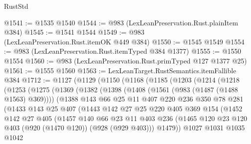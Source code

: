 \begin{lexlean}{RustStd}
\begin{coremodule}
@1541 := @1535 @1540
@1544 := @983 (LexLeanPreservation.Rust.plainItem @384)
@1545 := @1541 @1544
@1549 := @983 (LexLeanPreservation.Rust.itemOK @449 @384)
@1550 := @1545 @1549
@1554 := @983 (LexLeanPreservation.Rust.itemTyped @384 @1377)
@1555 := @1550 @1554
@1560 := @983 (LexLeanPreservation.Rust.primTyped @127 @1377 @25)
@1561 := @1555 @1560
@1563 := LexLeanTarget.RustSemantics.itemFallible @384
@1712 := @1127
    (@1129
      (@1150
        (@1168
          (@1185
            (@1203
              (@1214
                (@1218
                  (@1253
                    (@1275
                      (@1369
                        (@1382
                          (@1398
                            (@1408 (@1561 (@983 (@1487 (@1488 @1563) @369))))
                            (@1388
                              @143
                              @66
                              @25
                              @11
                              @407
                              @220
                              @236
                              @350
                              @78
                              @281
                              (@1433
                                @143
                                @25
                                @407
                                (@1443
                                  @142
                                  @27
                                  @25
                                  @220
                                  @405
                                  @369
                                  @154
                                  (@1452
                                    @142
                                    @27
                                    @405
                                    (@1457
                                      @140
                                      @66
                                      @23
                                      @11
                                      @403
                                      @236
                                      (@1465
                                        @120
                                        @23
                                        @120
                                        @403
                                        (@920 (@1470 @120))
                                        (@928 (@929 @403)))
                                      @1479))
                                  @1027
                                  @1031
                                  @1035
                                  @1042

\end{coremodule}
\end{lexlean}

